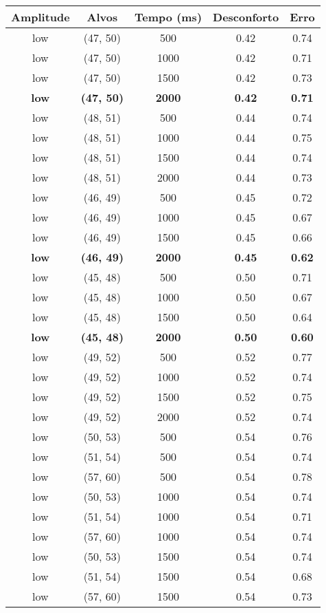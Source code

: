 \begin{tabular}{c c c c c}
\hline
Amplitude & Alvos & Tempo (ms) & Desconforto & Erro \\
\hline
low & (47, 50) &  500 & 0.42 & 0.74 \\
low & (47, 50) &  1000 & 0.42 & 0.71 \\
low & (47, 50) &  1500 & 0.42 & 0.73 \\
\textbf{low} & \textbf{(47, 50)} & \textbf{ 2000} & \textbf{0.42} & \textbf{0.71} \\
low & (48, 51) &  500 & 0.44 & 0.74 \\
low & (48, 51) &  1000 & 0.44 & 0.75 \\
low & (48, 51) &  1500 & 0.44 & 0.74 \\
low & (48, 51) &  2000 & 0.44 & 0.73 \\
low & (46, 49) &  500 & 0.45 & 0.72 \\
low & (46, 49) &  1000 & 0.45 & 0.67 \\
low & (46, 49) &  1500 & 0.45 & 0.66 \\
\textbf{low} & \textbf{(46, 49)} & \textbf{ 2000} & \textbf{0.45} & \textbf{0.62} \\
low & (45, 48) &  500 & 0.50 & 0.71 \\
low & (45, 48) &  1000 & 0.50 & 0.67 \\
low & (45, 48) &  1500 & 0.50 & 0.64 \\
\textbf{low} & \textbf{(45, 48)} & \textbf{ 2000} & \textbf{0.50} & \textbf{0.60} \\
low & (49, 52) &  500 & 0.52 & 0.77 \\
low & (49, 52) &  1000 & 0.52 & 0.74 \\
low & (49, 52) &  1500 & 0.52 & 0.75 \\
low & (49, 52) &  2000 & 0.52 & 0.74 \\
low & (50, 53) &  500 & 0.54 & 0.76 \\
low & (51, 54) &  500 & 0.54 & 0.74 \\
low & (57, 60) &  500 & 0.54 & 0.78 \\
low & (50, 53) &  1000 & 0.54 & 0.74 \\
low & (51, 54) &  1000 & 0.54 & 0.71 \\
low & (57, 60) &  1000 & 0.54 & 0.74 \\
low & (50, 53) &  1500 & 0.54 & 0.74 \\
low & (51, 54) &  1500 & 0.54 & 0.68 \\
low & (57, 60) &  1500 & 0.54 & 0.73 \\

\end{tabular}
